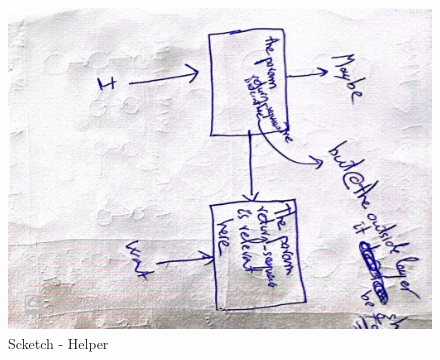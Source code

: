 \documentclass{article}
\begin{document}
  \begin{figure}
    \centering
    \includegraphics[width = \textwidth]{Images/3_.jpg}
    \caption{Scketch - Helper}
  \end{figure}
\end{document}
